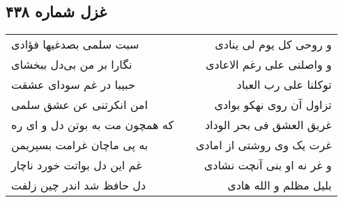 \begin{center}
\section*{غزل شماره ۴۳۸}
\label{sec:sh438}
\begin{longtable}{l p{0.5cm} r}
سبت سلمی بصدغیها فؤادی
&&
و روحی کل یوم لی ینادی
\\
نگارا بر من بی‌دل ببخشای
&&
و واصلنی علی رغم الاعادی
\\
حبیبا در غم سودای عشقت
&&
توکلنا علی رب العباد
\\
امن انکرتنی عن عشق سلمی
&&
تزاول آن روی نهکو بوادی
\\
که همچون مت به بوتن دل و ای ره
&&
غریق العشق فی بحر الوداد
\\
به پی ماچان غرامت بسپریمن
&&
غرت یک وی روشتی از امادی
\\
غم این دل بواتت خورد ناچار
&&
و غر نه او بنی آنچت نشادی
\\
دل حافظ شد اندر چین زلفت
&&
بلیل مظلم و الله هادی
\\
\end{longtable}
\end{center}
